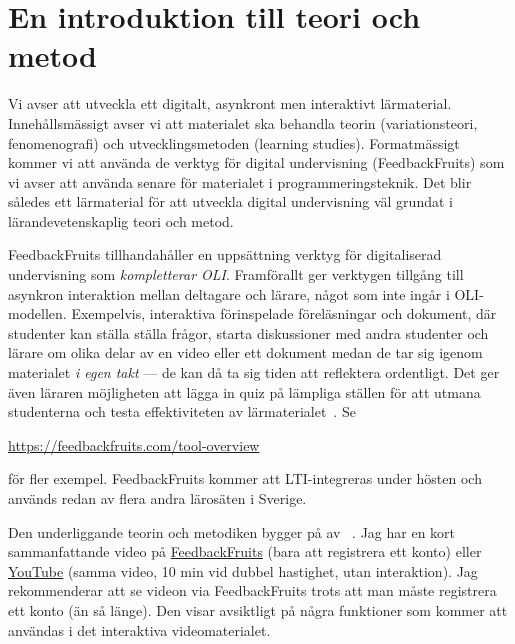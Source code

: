 \documentclass[a4paper,swedish]{article}
\begin{document}
\section{En introduktion till teori och metod}\label{intrometod}

Vi avser att utveckla ett digitalt, asynkront men interaktivt lärmaterial.
Innehållsmässigt avser vi att materialet ska behandla teorin (variationsteori, 
fenomenografi) och utvecklingsmetoden (learning studies).
Formatmässigt kommer vi att använda de verktyg för digital undervisning 
(FeedbackFruits) som vi avser att använda senare för materialet i 
programmeringsteknik.
Det blir således ett lärmaterial för att utveckla digital undervisning väl 
grundat i lärandevetenskaplig teori och metod.

FeedbackFruits tillhandahåller en uppsättning verktyg för digitaliserad 
undervisning som \emph{kompletterar OLI}.
Framförallt ger verktygen tillgång till asynkron interaktion mellan deltagare 
och lärare, något som inte ingår i OLI-modellen.
Exempelvis, interaktiva förinspelade föreläsningar och dokument, där studenter 
kan ställa ställa frågor, starta diskussioner med andra studenter och lärare om 
olika delar av en video eller ett dokument medan de tar sig igenom materialet 
\emph{i egen takt} --- de kan då ta sig tiden att reflektera ordentligt.
Det ger även läraren möjligheten att lägga in quiz på lämpliga ställen för att 
utmana studenterna och testa effektiviteten av 
lärmaterialet~\parencite{NecessaryConditionsOfLearning}.
Se
\begin{center}
  \url{https://feedbackfruits.com/tool-overview}
\end{center}
för fler exempel.
FeedbackFruits kommer att LTI-integreras under hösten och används redan av 
flera andra lärosäten i Sverige.

Den underliggande teorin och metodiken bygger på
av 
\citeauthor{NecessaryConditionsOfLearning}~\parencite*{NecessaryConditionsOfLearning}.
Jag har en kort sammanfattande video på
\href{https://eu.feedbackfruits.com/groups/activity-course/d04b0280-e219-42c4-aee1-1272609bc4bd}{FeedbackFruits} 
(bara att registrera ett konto)
eller
\href{https://youtu.be/_d42-kTKDcI}{YouTube}
(samma video, 10 min vid dubbel hastighet, utan interaktion).
Jag rekommenderar att se videon via FeedbackFruits trots att man måste 
registrera ett konto (än så länge). Den visar avsiktligt på några funktioner 
som kommer att användas i det interaktiva videomaterialet. 
\end{document}
